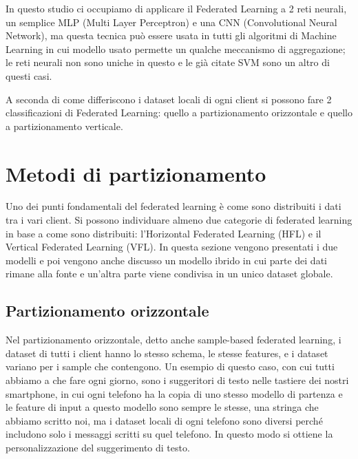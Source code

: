 In questo studio ci occupiamo di applicare il Federated Learning a 2 reti neurali,
un semplice MLP (Multi Layer Perceptron) e una CNN (Convolutional Neural Network),
ma questa tecnica può essere usata in tutti gli algoritmi di Machine Learning in 
cui modello usato permette un qualche meccanismo di aggregazione; le reti neurali
non sono uniche in questo e le già citate SVM sono un altro di questi casi.

A seconda di come differiscono i dataset locali di ogni client si possono
fare 2 classificazioni di Federated Learning: quello a partizionamento orizzontale
e quello a partizionamento verticale.

\section{Metodi di partizionamento}
Uno dei punti fondamentali del federated learning è come sono 
distribuiti i dati tra i vari client. Si possono individuare almeno due 
categorie di federated learning in base a come sono distribuiti: 
l'Horizontal Federated Learning (HFL) e il Vertical Federated Learning
(VFL). In questa sezione vengono presentati i due modelli e poi vengono 
anche discusso un modello ibrido in cui parte dei dati rimane alla fonte 
e un'altra parte viene condivisa in un unico dataset globale.

\subsection{Partizionamento orizzontale}
Nel partizionamento orizzontale, detto anche sample-based federated 
learning, i dataset di tutti i client hanno lo
stesso schema, le stesse features, e i dataset variano per i sample
che contengono. Un esempio di questo caso, con cui tutti abbiamo a che 
fare ogni giorno, sono i suggeritori di testo nelle tastiere dei 
nostri smartphone, in cui ogni telefono ha la copia di uno stesso 
modello di partenza e le feature di input a questo modello sono sempre 
le stesse, una stringa che abbiamo scritto noi, ma i dataset locali 
di ogni telefono sono diversi perché includono solo i messaggi scritti 
su quel telefono. In questo modo si ottiene la personalizzazione del 
suggerimento di testo.


